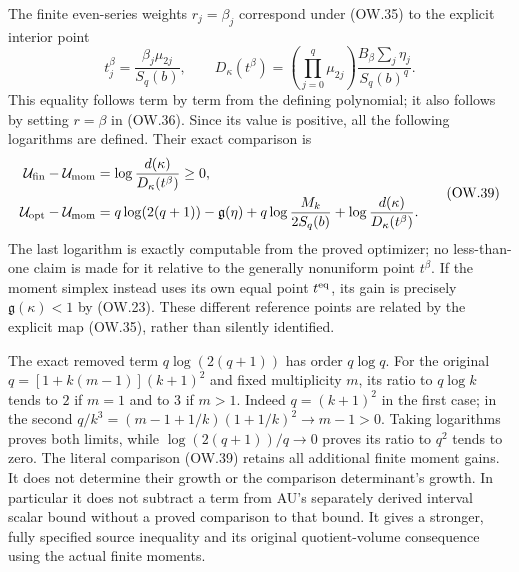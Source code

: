 The finite even-series weights $r_j=\beta_j$ correspond under (OW.35)
to the explicit interior point
\[
 t_j^\beta=\frac{\beta_j\mu_{2j}}{S_q(b)},\qquad
 D_\kappa(t^\beta)=
   \left(\prod_{j=0}^q\mu_{2j}\right)
       \frac{B_\beta\sum_j\eta_j}{S_q(b)^q}.
 \tag{OW.38}
\]
This equality follows term by term from the defining polynomial; it
also follows by setting $r=\beta$ in (OW.36). Since its value is positive,
all the following logarithms are defined. Their exact comparison is
\[
 \begin{split}
 \mathcal U_{\rm fin}-\mathcal U_{\rm mom}
    &=\log\frac{d(\kappa)}{D_\kappa(t^\beta)}\ge0,\\
 \mathcal U_{\rm opt}-\mathcal U_{\rm mom}
    &=q\log(2(q+1))-\mathfrak g(\eta)
       +q\log\frac{M_k}{2S_q(b)}
       +\log\frac{d(\kappa)}{D_\kappa(t^\beta)}.
 \end{split}                                                  \tag{OW.39}
\]
The last logarithm is exactly computable from the proved optimizer;
no less-than-one claim is made for it relative to the generally
nonuniform point $t^\beta$. If the moment simplex instead uses its
own equal point $t^{\rm eq}$, its gain is precisely
$\mathfrak g(\kappa)<1$ by (OW.23). These different reference points
are related by the explicit map (OW.35), rather than silently identified.

The exact removed term $q\log(2(q+1))$ has order $q\log q$.
For the original $q=[1+k(m-1)](k+1)^2$ and fixed multiplicity $m$,
its ratio to $q\log k$ tends to $2$ if $m=1$ and to $3$ if $m>1$.
Indeed $q=(k+1)^2$ in the first case; in the second
$q/k^3=(m-1+1/k)(1+1/k)^2\to m-1>0$.
Taking logarithms proves both limits, while
$\log(2(q+1))/q\to0$ proves its ratio to $q^2$ tends to zero.
The literal comparison (OW.39) retains all additional finite moment
gains. It does not determine their growth or the comparison determinant's
growth. In particular it does not subtract a term from AU's separately
derived interval scalar bound without a proved comparison to that bound.
It gives a stronger, fully specified source inequality and its original
quotient-volume consequence using the actual finite moments.

